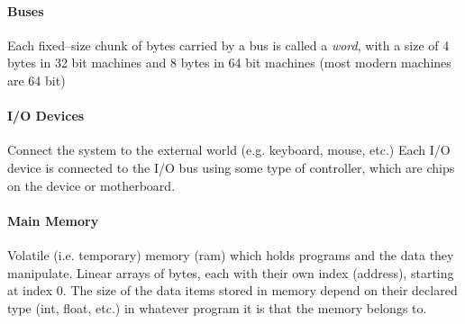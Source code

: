 \documentclass[../bryant_comp_sys.tex]{subfiles}
\begin{document}
            \paragraph{Buses}
                \begin{outline}
                    \1 Each fixed--size chunk of bytes carried by a \gls{bus} is called a \textit{\gls{word}}, with a size of 4 bytes in 32 bit machines and 8 bytes in 64 bit machines (most modern machines are 64 bit)
                \end{outline}

            \paragraph{I/O Devices}
                \begin{outline}
                    \1 Connect the system to the external world (e.g. keyboard, mouse, etc.)
                    \1 Each I/O device is connected to the I/O bus using some type of controller, which are chips on the device or motherboard.
                \end{outline}

            \paragraph{Main Memory}
                \begin{outline}
                    \1 Volatile (i.e. temporary) memory (\gls{ram}) which holds programs and the data they manipulate. 
                    \1 Linear arrays of bytes, each with their own index (address), starting at index 0.
                    \1 The size of the data items stored in memory depend on their declared type (int, float, etc.) in whatever program it is that the memory belongs to.
                \end{outline}
\end{document}
